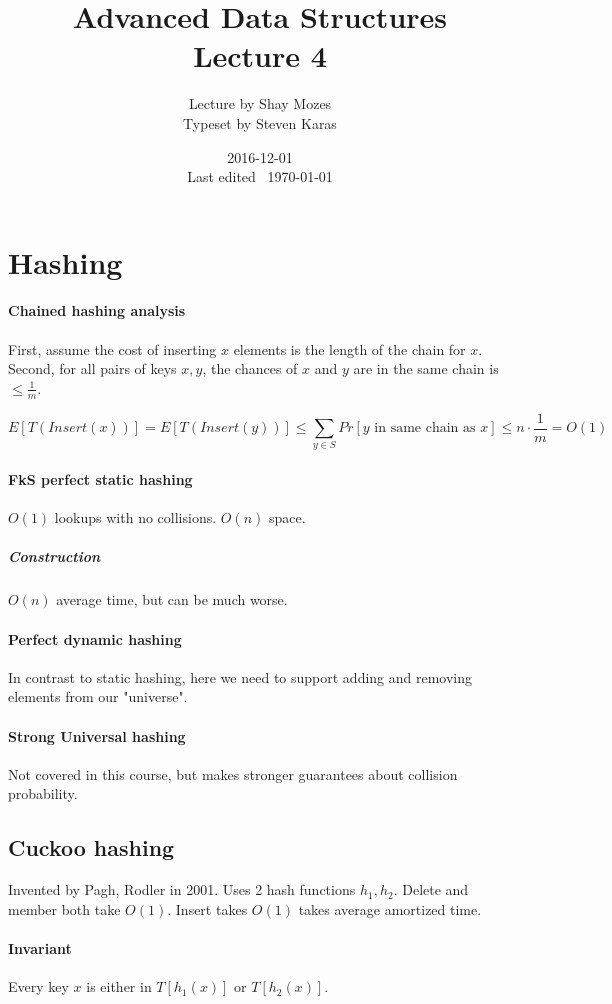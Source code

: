 \documentclass[a4paper]{article}
\title{Advanced Data Structures\\\large Lecture 4}
\date{2016-12-01 \\ Last edited \currenttime\ \today}
\author{Lecture by Shay Mozes\\Typeset by Steven Karas}
\begin{document}
\maketitle

\section{Hashing}

\paragraph{Chained hashing analysis}
First, assume the cost of inserting $x$ elements is the length of the chain for $x$.
Second, for all pairs of keys $x,y$, the chances of $x$ and $y$ are in the same chain is $\le \frac{1}{m}$.

\[E[T(Insert(x))]=E[T(Insert(y))] \le \sum_{y\in S} Pr[y\text{ in same chain as }x] \le n\cdot \frac{1}{m}=O(1)\]

\paragraph{FkS perfect static hashing}
$O(1)$ lookups with no collisions. $O(n)$ space.

\subparagraph{Construction}
$O(n)$ average time, but can be much worse.

\paragraph{Perfect dynamic hashing}
In contrast to static hashing, here we need to support adding and removing elements from our "universe".

\paragraph{Strong Universal hashing}
Not covered in this course, but makes stronger guarantees about collision probability.

\subsection{Cuckoo hashing}
Invented by Pagh, Rodler in 2001. Uses 2 hash functions $h_1, h_2$. Delete and member both take $O(1)$. Insert takes $O(1)$ takes average amortized time.

\paragraph{Invariant}
Every key $x$ is either in $T[h_1(x)]$ or $T[h_2(x)]$.
\end{document}
